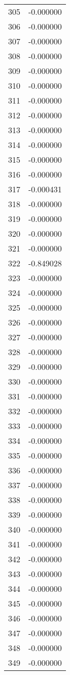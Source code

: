 \documentclass[12pt]{article}
\begin{document}
\begin{longtable}{@{}cc@{}}
305 & -0.000000 \\
306 & -0.000000 \\
307 & -0.000000 \\
308 & -0.000000 \\
309 & -0.000000 \\
310 & -0.000000 \\
311 & -0.000000 \\
312 & -0.000000 \\
313 & -0.000000 \\
314 & -0.000000 \\
315 & -0.000000 \\
316 & -0.000000 \\
317 & -0.000431 \\
318 & -0.000000 \\
319 & -0.000000 \\
320 & -0.000000 \\
321 & -0.000000 \\
322 & -0.849028 \\
323 & -0.000000 \\
324 & -0.000000 \\
325 & -0.000000 \\
326 & -0.000000 \\
327 & -0.000000 \\
328 & -0.000000 \\
329 & -0.000000 \\
330 & -0.000000 \\
331 & -0.000000 \\
332 & -0.000000 \\
333 & -0.000000 \\
334 & -0.000000 \\
335 & -0.000000 \\
336 & -0.000000 \\
337 & -0.000000 \\
338 & -0.000000 \\
339 & -0.000000 \\
340 & -0.000000 \\
341 & -0.000000 \\
342 & -0.000000 \\
343 & -0.000000 \\
344 & -0.000000 \\
345 & -0.000000 \\
346 & -0.000000 \\
347 & -0.000000 \\
348 & -0.000000 \\
349 & -0.000000 \\

\end{longtable}
\end{document}
